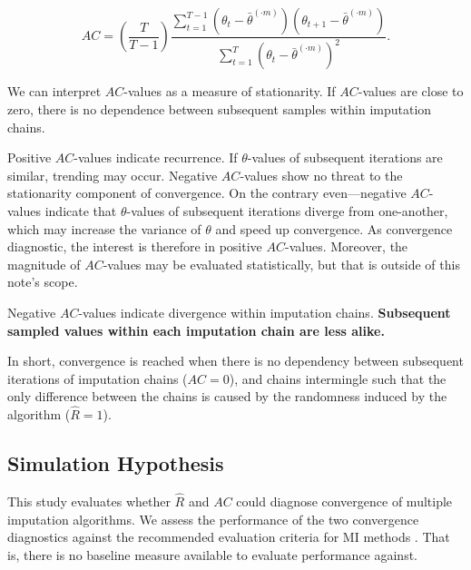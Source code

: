 \documentclass[Royal,times,sageh]{sagej}
\begin{document}
\begin{equation*}
AC = \left( \frac{T}{T-1} \right) \frac{\sum_{t=1}^{T-1}(\theta_t - \bar{\theta}^{(\cdot m)})(\theta_{t+1} - \bar{\theta}^{(\cdot m)})}{\sum_{t=1}^{T}(\theta_t - \bar{\theta}^{(\cdot m)})^2}.
\end{equation*}

We can interpret \(AC\)-values as a measure of stationarity. If
\(AC\)-values are close to zero, there is no dependence between
subsequent samples within imputation chains.

Positive \(AC\)-values indicate recurrence. If \(\theta\)-values of
subsequent iterations are similar, trending may occur. Negative
\(AC\)-values show no threat to the stationarity component of
convergence. On the contrary even---negative \(AC\)-values indicate that
\(\theta\)-values of subsequent iterations diverge from one-another,
which may increase the variance of \(\theta\) and speed up convergence.
As convergence diagnostic, the interest is therefore in positive
\(AC\)-values. Moreover, the magnitude of \(AC\)-values may be evaluated
statistically, but that is outside of this note's scope.

Negative \(AC\)-values indicate divergence within imputation chains.
\textbf{Subsequent sampled values within each imputation chain are less
alike.}

In short, convergence is reached when there is no dependency between
subsequent iterations of imputation chains (\(AC = 0\)), and chains
intermingle such that the only difference between the chains is caused
by the randomness induced by the algorithm (\(\widehat{R} = 1\)).

\hypertarget{simulation-hypothesis}{%
\subsection{Simulation Hypothesis}\label{simulation-hypothesis}}

This study evaluates whether \(\widehat{R}\) and \(AC\) could diagnose
convergence of multiple imputation algorithms. We assess the performance
of the two convergence diagnostics against the recommended evaluation
criteria for MI methods \citep[i.e., average bias, average confidence
interval width, and empirical coverage rate across simulations;][\(\S\)
2.5.2]{buur18}. That is, there is no baseline measure available to
evaluate performance against.
\end{document}
